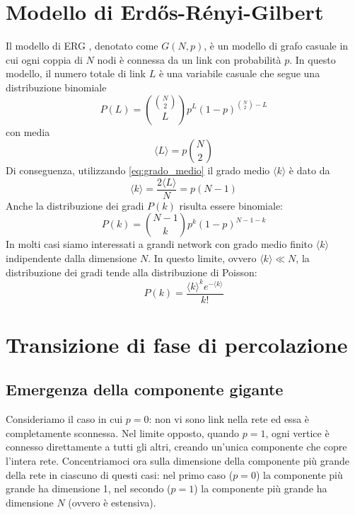 \documentclass[12pt,italian]{article}
\begin{document}
\section{Modello di Erdős-Rényi-Gilbert}
Il modello di ERG \cite{newman2018networks}, denotato come $G(N, p)$, è un modello di grafo casuale in cui ogni coppia di $N$ nodi è connessa da un link con probabilità $p$.
In questo modello, il numero totale di link $L$ è una variabile casuale che segue una distribuzione binomiale
\begin{equation}
    P(L) = \binom{\binom{N}{2}}{L} p^L (1-p)^{\binom{N}{2} - L}
\end{equation}
con media
\begin{equation}
    \langle L \rangle = p \binom{N}{2}
\end{equation}
Di conseguenza, utilizzando \cref{eq:grado_medio} il grado medio $\langle k \rangle$ è dato da
\begin{equation}
    \langle k \rangle = \frac{2 \langle L \rangle}{N} = p (N - 1)
\end{equation}
Anche la distribuzione dei gradi $P(k)$ risulta essere binomiale:
\begin{equation}
    P(k) = \binom{N-1}{k} p^k (1-p)^{N-1-k}
\end{equation}
In molti casi siamo interessati a grandi network con grado medio finito $\langle k \rangle$ indipendente dalla dimensione $N$. In questo limite, ovvero $ \langle k \rangle \ll N $, la distribuzione dei gradi tende alla distribuzione di Poisson:
\begin{equation}
    P(k) = \frac{\langle k \rangle^k e^{-\langle k \rangle}}{k!}
\end{equation}

\section{Transizione di fase di percolazione}
\subsection{Emergenza della componente gigante}
Consideriamo il caso in cui $p = 0$: non vi sono link nella rete ed essa è completamente sconnessa. Nel limite opposto, quando $p = 1$, ogni vertice è connesso direttamente a tutti gli altri, creando un'unica componente che copre l'intera rete. Concentriamoci ora sulla dimensione della componente più grande della rete in ciascuno di questi casi: nel primo caso ($p = 0$) la componente più grande ha dimensione 1, nel secondo ($p = 1$) la componente più grande ha dimensione $N$ (ovvero è estensiva).
\end{document}
